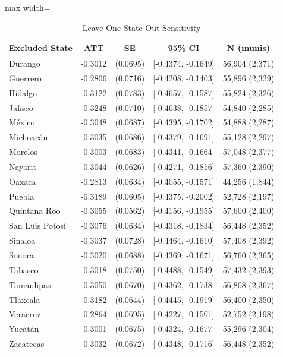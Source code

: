 \begin{table}[htbp]
\centering
\caption{Leave-One-State-Out Sensitivity}
\label{tab:loo}
\begin{adjustbox}{max width=\textwidth}
\begin{tabular}{lcccc}
\toprule
Excluded State & ATT & SE & 95\% CI & N (munis) \\
\midrule
Durango & -0.3012 & (0.0695) & [-0.4374, -0.1649] & 56,904 (2,371) \\
Guerrero & -0.2806 & (0.0716) & [-0.4208, -0.1403] & 55,896 (2,329) \\
Hidalgo & -0.3122 & (0.0783) & [-0.4657, -0.1587] & 55,824 (2,326) \\
Jalisco & -0.3248 & (0.0710) & [-0.4638, -0.1857] & 54,840 (2,285) \\
México & -0.3048 & (0.0687) & [-0.4395, -0.1702] & 54,888 (2,287) \\
Michoacán & -0.3035 & (0.0686) & [-0.4379, -0.1691] & 55,128 (2,297) \\
Morelos & -0.3003 & (0.0683) & [-0.4341, -0.1664] & 57,048 (2,377) \\
Nayarit & -0.3044 & (0.0626) & [-0.4271, -0.1816] & 57,360 (2,390) \\
Oaxaca & -0.2813 & (0.0634) & [-0.4055, -0.1571] & 44,256 (1,844) \\
Puebla & -0.3189 & (0.0605) & [-0.4375, -0.2002] & 52,728 (2,197) \\
Quintana Roo & -0.3055 & (0.0562) & [-0.4156, -0.1955] & 57,600 (2,400) \\
San Luis Potosí & -0.3076 & (0.0634) & [-0.4318, -0.1834] & 56,448 (2,352) \\
Sinaloa & -0.3037 & (0.0728) & [-0.4464, -0.1610] & 57,408 (2,392) \\
Sonora & -0.3020 & (0.0688) & [-0.4369, -0.1671] & 56,760 (2,365) \\
Tabasco & -0.3018 & (0.0750) & [-0.4488, -0.1549] & 57,432 (2,393) \\
Tamaulipas & -0.3050 & (0.0670) & [-0.4362, -0.1738] & 56,808 (2,367) \\
Tlaxcala & -0.3182 & (0.0644) & [-0.4445, -0.1919] & 56,400 (2,350) \\
Veracruz & -0.2864 & (0.0695) & [-0.4227, -0.1501] & 52,752 (2,198) \\
Yucatán & -0.3001 & (0.0675) & [-0.4324, -0.1677] & 55,296 (2,304) \\
Zacatecas & -0.3032 & (0.0672) & [-0.4348, -0.1716] & 56,448 (2,352) \\

\end{tabular}
\end{adjustbox}
\end{table}
